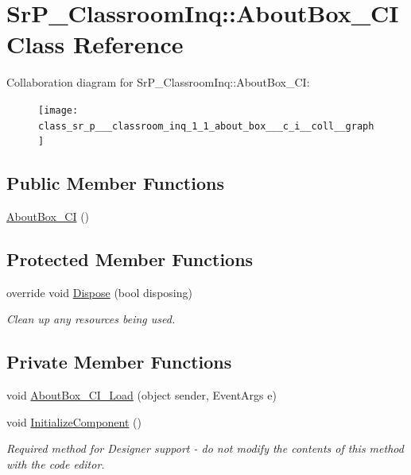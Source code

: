 \hypertarget{class_sr_p___classroom_inq_1_1_about_box___c_i}{
\section{\-Sr\-P\-\_\-\-Classroom\-Inq\-:\-:\-About\-Box\-\_\-\-C\-I \-Class \-Reference}
\label{class_sr_p___classroom_inq_1_1_about_box___c_i}
}


\-Collaboration diagram for \-Sr\-P\-\_\-\-Classroom\-Inq\-:\-:\-About\-Box\-\_\-\-C\-I\-:\nopagebreak
\begin{figure}[H]
\begin{center}
\leavevmode
\texttt{[image: class\_sr\_p\_\_\_classroom\_inq\_1\_1\_about\_box\_\_\_c\_i\_\_coll\_\_graph]}
\end{center}
\end{figure}
\subsection*{\-Public \-Member \-Functions}
\begin{DoxyCompactItemize}
\item 
\hyperlink{class_sr_p___classroom_inq_1_1_about_box___c_i_a934d9846306f3178ae0226075ffb74a4}{\-About\-Box\-\_\-\-C\-I} ()
\end{DoxyCompactItemize}
\subsection*{\-Protected \-Member \-Functions}
\begin{DoxyCompactItemize}
\item 
override void \hyperlink{class_sr_p___classroom_inq_1_1_about_box___c_i_ae5067d87681378522d6c89d961b97916}{\-Dispose} (bool disposing)
\begin{DoxyCompactList}\small\item\em \-Clean up any resources being used. \end{DoxyCompactList}\end{DoxyCompactItemize}
\subsection*{\-Private \-Member \-Functions}
\begin{DoxyCompactItemize}
\item 
void \hyperlink{class_sr_p___classroom_inq_1_1_about_box___c_i_ac28f18b46795ce08cc4274b6d193c1b2}{\-About\-Box\-\_\-\-C\-I\-\_\-\-Load} (object sender, \-Event\-Args e)
\item 
void \hyperlink{class_sr_p___classroom_inq_1_1_about_box___c_i_ad6be5745e3405079d6717e7a7462c649}{\-Initialize\-Component} ()
\begin{DoxyCompactList}\small\item\em \-Required method for \-Designer support -\/ do not modify the contents of this method with the code editor. \end{DoxyCompactList}\end{DoxyCompactItemize}
